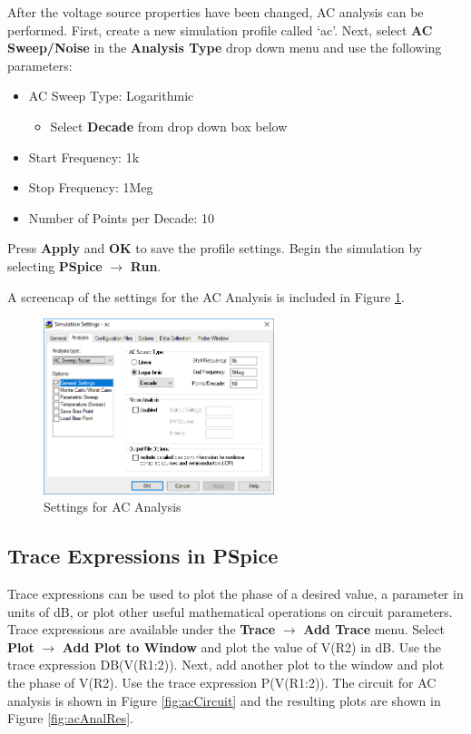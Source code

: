 \documentclass[12pt]{../manual}
\begin{document}
After the voltage source properties have been changed, AC analysis can be performed. First, create a new simulation profile called `ac'. Next, select \textbf{AC Sweep/Noise} in the \textbf{Analysis Type} drop down menu and use the following parameters:
\begin{itemize}
\item AC Sweep Type: Logarithmic 
\begin{itemize}
\item Select \textbf{Decade} from drop down box below
\end{itemize}
\item Start Frequency: 1k
\item Stop Frequency: 1Meg
\item Number of Points per Decade: 10
\end{itemize}
Press \textbf{Apply} and \textbf{OK} to save the profile settings. Begin the simulation by selecting \textbf{PSpice} $\to$ \textbf{Run}.

A screencap of the settings for the AC Analysis is included in Figure \ref{fig:acSettings}.

\begin{figure}[ht!]
\begin{center}
\includegraphics[width=0.6\textwidth]{figures/ACAnalysisSettings.PNG}
\caption{Settings for AC Analysis}
\label{fig:acSettings}
\end{center}
\end{figure}

\subsection*{Trace Expressions in PSpice}
Trace expressions can be used to plot the phase of a desired value, a parameter in units of dB, or plot other useful mathematical operations on circuit parameters. Trace expressions are available under the \textbf{Trace} $\to$ \textbf{Add Trace} menu. Select \textbf{Plot} $\to$ \textbf{Add Plot to Window} and plot the value of V(R2) in dB. Use the trace expression DB(V(R1:2)). Next, add another plot to the window and plot the phase of V(R2). Use the trace expression P(V(R1:2)). The circuit for AC analysis is shown in Figure \ref{fig:acCircuit} and the resulting plots are shown in Figure \ref{fig:acAnalRes}.
\end{document}
